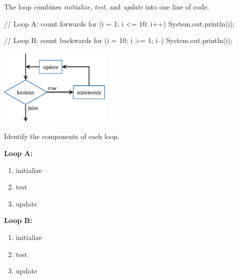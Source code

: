 
The  loop combines \emph{initialize}, \emph{test}, and \emph{update} into one line of code.

\vspace{1ex}
\begin{minipage}{0.6\linewidth}
\begin{javalst}
    // Loop A: count forwards
    for (i = 1; i <= 10; i++) {
        System.out.println(i);
    }

    // Loop B: count backwards
    for (i = 10; i >= 1; i--) {
        System.out.println(i);
    }
\end{javalst}
\end{minipage}
\hfill
\begin{minipage}{0.38\linewidth}
\centering
\includegraphics[height=10em]{for.pdf}
\end{minipage}




\Q Identify the components of each  loop.

\begin{multicols}{2}

\textbf{Loop A:}

\begin{enumerate}
\item initialize 
\item test       
\item update     
\end{enumerate}

\columnbreak

\textbf{Loop B:}

\begin{enumerate}
\item initialize 
\item test       
\item update     
\end{enumerate}

\end{multicols}


